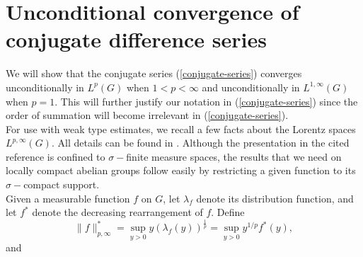 \section{Unconditional convergence of conjugate difference series}
\newtheorem{conjugate-projection}{Theorem}[section]
\newtheorem{finite-conjugate-projection}[conjugate-projection]{Corollary}
\newtheorem{unconditional-convergence}[conjugate-projection]{Theorem}
\newtheorem{partial-sum}[conjugate-projection]{Corollary}
\newtheorem{theorem-square-function}[conjugate-projection]{Theorem}
We will show that the conjugate series 
(\ref{conjugate-series})
converges unconditionally in $L^p(G)$
when $1<p<\infty$ and unconditionally in $L^{1,\infty}(G)$
when $p=1$.  This will further justify our notation
in (\ref{conjugate-series})
since the order of summation will become irrelevant
in (\ref{conjugate-series}).\\
For use with weak type estimates, we
recall a few facts about the Lorentz spaces
$L^{p,\infty}(G)$.  All details can be found
in \cite[Chapter V, Section 3]{sw}.  Although
the presentation in the cited reference is confined
to $\sigma-$finite measure spaces,
the results that we need on locally
compact abelian groups follow easily
by restricting a given function
to its $\sigma-$compact support.\\
Given a measurable function $f$ on $G$,
let $\lambda_f$ denote its
distribution function, and let $f^*$ denote the
decreasing rearrangement of $f$.  Define
\begin{equation}
\| f\|^*_{p,\infty}=\sup_{y>0}
y\left( \lambda_f (y)\right)^\frac{1}{p}=
\sup_{y>0}y^{1/p} f^*(y),
\label{lorentz-pseudo-norm}
\end{equation} 
and
